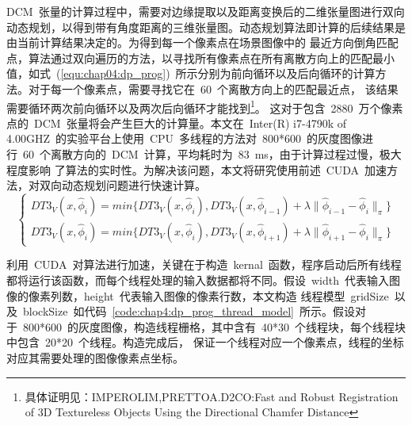 DCM~张量的计算过程中，需要对边缘提取以及距离变换后的二维张量图进行双向动态规划，以得到带有角度距离的三维张量图。动态规划算法即计算的后续结果是由当前计算结果决定的。为得到每一个像素点在场景图像中的
最近方向倒角匹配点，算法通过双向遍历的方法，以寻找所有像素点在所有离散方向上的匹配最小值，如式~(\ref{equ:chap04:dp_prog})~所示分别为前向循环以及后向循环的计算方法。对于每一个像素点，需要寻找它在~60~个离散方向上的匹配最近点，
该结果需要循环两次前向循环以及两次后向循环才能找到\footnote{具体证明见：IMPEROLIM,PRETTOA.D2CO:Fast and Robust Registration of 3D Textureless Objects Using the Directional Chamfer Distance}。
这对于包含~2880~万个像素点的~DCM~张量将会产生巨大的计算量。本文在~Inter(R) i7-4790k of 4.00GHZ~的实验平台上使用~CPU~多线程的方法对~800*600~的灰度图像进行~60~个离散方向的~DCM~计算，平均耗时为~83~ms，由于计算过程过慢，极大程度影响
了算法的实时性。为解决该问题，本文将研究使用前述~CUDA~加速方法，对双向动态规划问题进行快速计算。
\begin{equation}
  \label{equ:chap04:dp_prog}
  \left\{
    \begin{aligned}{}
      DT3_V(x,\hat{\phi}_i)=min\{DT3_V(x,\hat{\phi}_i), DT3_V(x,\hat{\phi}_{i-1})+\lambda\lVert \hat{\phi}_{i-1}-\hat{\phi}_{i}\rVert_\pi\}\\
      DT3_V(x,\hat{\phi}_i)=min\{DT3_V(x,\hat{\phi}_i), DT3_V(x,\hat{\phi}_{i+1})+\lambda\lVert \hat{\phi}_{i+1}-\hat{\phi}_{i}\rVert_\pi\}
    \end{aligned}
    \right.
\end{equation}

利用~CUDA~对算法进行加速，关键在于构造~kernal~函数，程序启动后所有线程都将运行该函数，而每个线程处理的输入数据都将不同。假设~width~代表输入图像的像素列数，height~代表输入图像的像素行数，本文构造
线程模型~gridSize~以及~blockSize~如代码~\ref{code:chap4:dp_prog_thread_model}~所示。假设对于~800*600~的灰度图像，构造线程栅格，其中含有~40*30~个线程块，每个线程块中包含~20*20~个线程。构造完成后，
保证一个线程对应一个像素点，线程的坐标对应其需要处理的图像像素点坐标。

